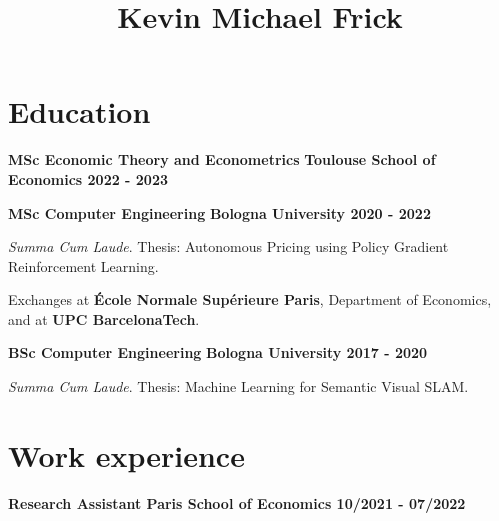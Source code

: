 \documentclass[11pt, a4paper]{article}
\title{Kevin Michael Frick}
\author{}
\begin{document}
\maketitle

\section*{Education}

\textbf{MSc Economic Theory and Econometrics} \hfill \textbf{Toulouse School of Economics \textbar{} 2022 - 2023}

\textbf{MSc Computer Engineering} \hfill  \textbf{ Bologna University
\textbar{} 2020 - 2022}

\textit{Summa Cum Laude}. Thesis: Autonomous Pricing using Policy Gradient Reinforcement Learning.

Exchanges at \textbf{École Normale Supérieure Paris}, Department of Economics, and at \textbf{UPC
BarcelonaTech}.

\textbf{BSc Computer Engineering} \hfill \textbf{Bologna University
\textbar{} 2017 - 2020}

\textit{Summa Cum Laude}. Thesis: Machine Learning for Semantic Visual SLAM.




\section*{Work experience}


\textbf{Research Assistant \hfill  \hspace{1pt} Paris School of Economics \textbar{} 10/2021 - 07/2022}
\end{document}
